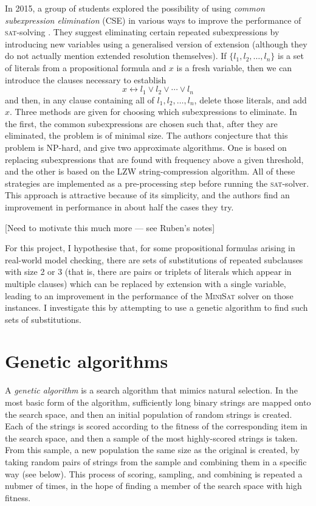 \documentclass[proof,pdftex,11pt,a4,titlepage]{article}
\newcommand{\sat}{\textsc{sat}}
\begin{document}
In 2015, a group of students explored the possibility of using \emph{common subexpression elimination} (CSE) in various ways to improve the performance of \sat{}-solving \cite{Yan:2015}. They suggest eliminating certain repeated subexpressions by introducing new variables using a generalised version of extension (although they do not actually mention extended resolution themselves). If $\{l_1, l_2, \ldots, l_n\}$ is a set of literals from a propositional formula and $x$ is a fresh variable, then we can introduce the clauses necessary to establish
\[x \leftrightarrow l_1 \vee l_2 \vee \cdots \vee l_n\]
and then, in any clause containing all of $l_1, l_2, \ldots, l_n$, delete those literals, and add $x$. Three methods are given for choosing which subexpressions to eliminate. In the first, the common subexpressions are chosen such that, after they are eliminated, the problem is of minimal size. The authors conjecture that this problem is NP-hard, and give two approximate algorithms. One is based on replacing subexpressions that are found with frequency above a given threshold, and the other is based on the LZW string-compression algorithm. All of these strategies are implemented as a pre-processing step before running the \sat{}-solver. This approach is attractive because of its simplicity, and the authors find an improvement in performance in about half the cases they try.

[Need to motivate this much more --- see Ruben's notes]

For this project, I hypothesise that, for some propositional formulas arising in real-world model checking, there are sets of substitutions of repeated subclauses with size 2 or 3 (that is, there are pairs or triplets of literals which appear in multiple clauses) which can be replaced by extension with a single variable, leading to an improvement in the performance of the \textsc{MiniSat} solver on those instances. I investigate this by attempting to use a genetic algorithm to find such sets of substitutions.

\section{Genetic algorithms}

A \emph{genetic algorithm} is a search algorithm that mimics natural selection. In the most basic form of the algorithm, sufficiently long binary strings are mapped onto the search space, and then an initial population of random strings is created. Each of the strings is scored according to the fitness of the corresponding item in the search space, and then a sample of the most highly-scored strings is taken. From this sample, a new population the same size as the original is created, by taking random pairs of strings from the sample and combining them in a specific way (see below). This process of scoring, sampling, and combining is repeated a nubmer of times, in the hope of finding a member of the search space with high fitness.
\end{document}
